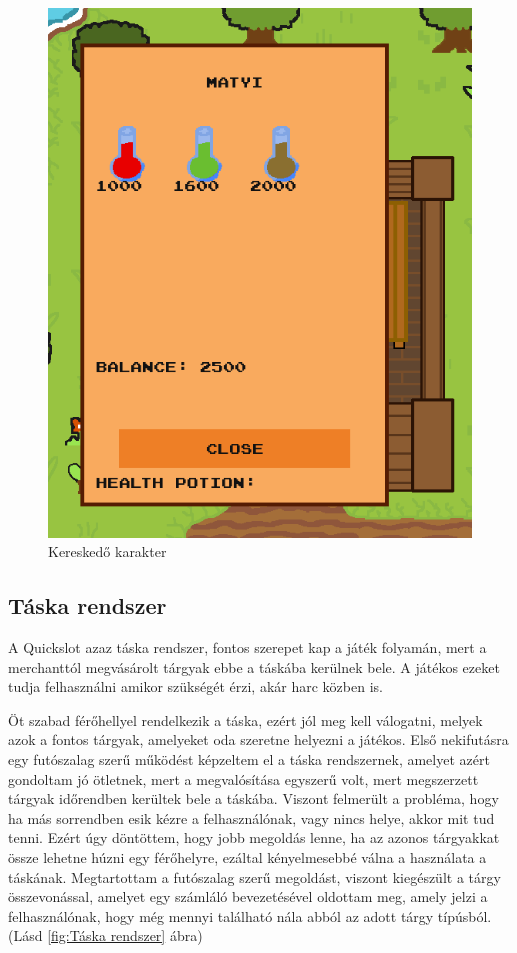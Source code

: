 \begin{figure}[H]
    \centering
    \includegraphics[width=9.0truecm]{images/merchant.png}
    \caption{Kereskedő karakter}
    \label{fig:Merchant}
\end{figure}


\subsection{Táska rendszer}

 A Quickslot azaz táska rendszer, fontos szerepet kap a játék folyamán, mert a merchanttól megvásárolt tárgyak ebbe a táskába kerülnek bele. A játékos ezeket tudja felhasználni amikor szükségét érzi, akár harc közben is.

Öt szabad férőhellyel rendelkezik a táska, ezért jól meg kell válogatni, melyek azok a fontos tárgyak, amelyeket oda szeretne helyezni a játékos. Első nekifutásra egy futószalag szerű működést képzeltem el a táska rendszernek, amelyet azért gondoltam jó ötletnek, mert a megvalósítása egyszerű volt, mert megszerzett tárgyak időrendben kerültek bele a táskába. Viszont felmerült a probléma, hogy ha más sorrendben esik kézre a felhasználónak, vagy nincs helye, akkor mit tud tenni. Ezért úgy döntöttem, hogy jobb megoldás lenne, ha az azonos tárgyakkat össze lehetne húzni egy férőhelyre, ezáltal kényelmesebbé válna a használata a táskának. Megtartottam a futószalag szerű megoldást, viszont kiegészült a tárgy összevonással, amelyet egy számláló bevezetésével oldottam meg, amely jelzi a felhasználónak, hogy még mennyi található nála abból az adott tárgy típúsból. (Lásd \ref{fig:Táska rendszer} ábra)


